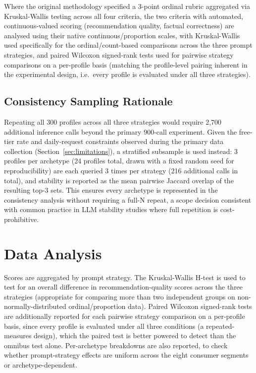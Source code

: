 Where the original methodology specified a 3-point ordinal rubric aggregated via Kruskal-Wallis testing across all four criteria, the two criteria with automated, continuous-valued scoring (recommendation quality, factual correctness) are analysed using their native continuous/proportion scales, with Kruskal-Wallis used specifically for the ordinal/count-based comparisons across the three prompt strategies, and paired Wilcoxon signed-rank tests used for pairwise strategy comparisons on a per-profile basis (matching the profile-level pairing inherent in the experimental design, i.e.\ every profile is evaluated under all three strategies).

\subsection{Consistency Sampling Rationale}
\label{sec:consistency-rationale}

Repeating all 300 profiles across all three strategies would require 2,700 additional inference calls beyond the primary 900-call experiment. Given the free-tier rate and daily-request constraints observed during the primary data collection (Section~\ref{sec:limitations}), a stratified subsample is used instead: 3 profiles per archetype (24 profiles total, drawn with a fixed random seed for reproducibility) are each queried 3 times per strategy (216 additional calls in total), and stability is reported as the mean pairwise Jaccard overlap of the resulting top-3 sets. This ensures every archetype is represented in the consistency analysis without requiring a full-N repeat, a scope decision consistent with common practice in LLM stability studies where full repetition is cost-prohibitive.

\section{Data Analysis}

Scores are aggregated by prompt strategy. The Kruskal-Wallis H-test is used to test for an overall difference in recommendation-quality scores across the three strategies (appropriate for comparing more than two independent groups on non-normally-distributed ordinal/proportion data). Paired Wilcoxon signed-rank tests are additionally reported for each pairwise strategy comparison on a per-profile basis, since every profile is evaluated under all three conditions (a repeated-measures design), which the paired test is better powered to detect than the omnibus test alone. Per-archetype breakdowns are also reported, to check whether prompt-strategy effects are uniform across the eight consumer segments or archetype-dependent.

